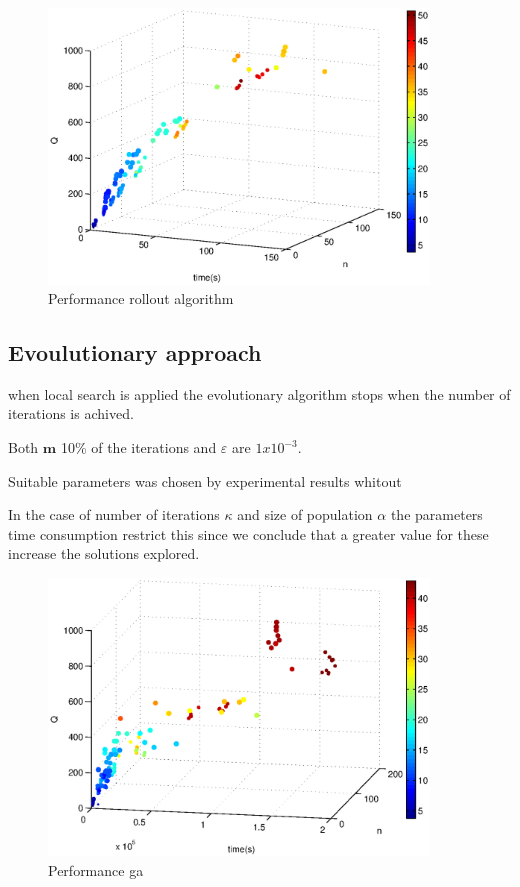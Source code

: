 \begin{figure}[!htbp]
  \begin{center}
   \includegraphics[width=0.9\textwidth]{Images/Chapter5/compare_expected_distance_ra.eps}
  \end{center}
    \caption{Performance rollout algorithm}\label{fig:compare_expected_distance_ra}
\end{figure}

\subsection{Evoulutionary approach}

when local search is applied the evolutionary algorithm stops when the number of iterations is achived.

Both $\mathbf{m}$ 10\% of the iterations  and $\varepsilon$ are $1x10^{-3}$.

Suitable parameters was chosen by experimental results whitout 

In the case of number of iterations $\kappa$ and size of population $\alpha$ the parameters time consumption restrict this since we conclude that a greater value for these increase the solutions explored.

\begin{figure}[!htbp]
  \begin{center}
   \includegraphics[width=0.9\textwidth]{Images/Chapter5/compare_expected_distance_ga.eps}
  \end{center}
    \caption{Performance ga}\label{fig:compare_expected_distance_ga}
\end{figure}

